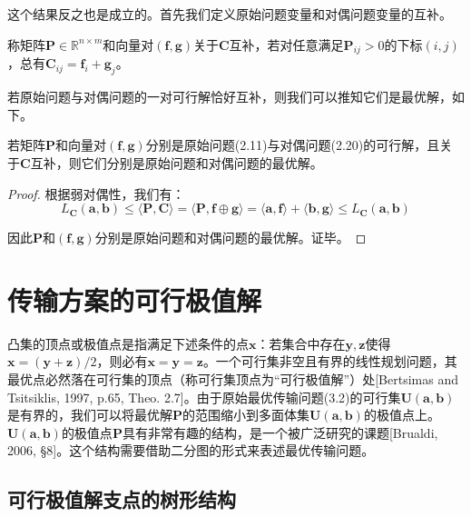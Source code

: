 \documentclass[cn,10pt,math=newtx,citestyle=gb7714-2015,bibstyle=gb7714-2015]{elegantbook}
\begin{document}
这个结果反之也是成立的。首先我们定义原始问题变量和对偶问题变量的互补。

\begin{definition}[互补]
称矩阵$\mathbf{P}\in\mathbb{R}^{n\times m}$和向量对$(\mathbf{f,g})$关于$\mathbf{C}$互补，若对任意满足$\mathbf{P}_{ij}>0$的下标$(i,j)$，总有$\mathbf{C}_{ij}=\mathbf{f}_i+\mathbf{g}_j$。
\end{definition}

若原始问题与对偶问题的一对可行解恰好互补，则我们可以推知它们是最优解，如下。

\begin{proposition}
若矩阵$\mathbf{P}$和向量对$(\mathbf{f,g})$分别是原始问题(2.11)与对偶问题(2.20)的可行解，且关于$\mathbf{C}$互补，则它们分别是原始问题和对偶问题的最优解。
\end{proposition}

\begin{proof}
根据弱对偶性，我们有：
\begin{equation*}
    L_\mathbf{C}(\mathbf{a,b})\leq \langle \mathbf{P},\mathbf{C} \rangle = \langle \mathbf{P}, \mathbf{f}\oplus \mathbf{g} \rangle = \langle \mathbf{a,f} \rangle + \langle \mathbf{b,g} \rangle \leq L_\mathbf{C}(\mathbf{a,b})
\end{equation*}

因此$\mathbf{P}$和$(\mathbf{f,g})$分别是原始问题和对偶问题的最优解。证毕。
\end{proof}

\section{传输方案的可行极值解}

凸集的顶点或极值点是指满足下述条件的点$\mathbf{x}$：若集合中存在$\mathbf{y,z}$使得$\mathbf{x}=(\mathbf{y}+\mathbf{z})/2$，则必有$\mathbf{x=y=z}$。一个可行集非空且有界的线性规划问题，其最优点必然落在可行集的顶点（称可行集顶点为“可行极值解”）处[Bertsimas and Tsitsiklis, 1997, p.65, Theo. 2.7]。由于原始最优传输问题(3.2)的可行集$\mathbf{U(a,b)}$是有界的，我们可以将最优解$\mathbf{P}$的范围缩小到多面体集$\mathbf{U(a,b)}$的极值点上。$\mathbf{U(a,b)}$的极值点$\mathbf{P}$具有非常有趣的结构，是一个被广泛研究的课题[Brualdi, 2006, \S 8]。这个结构需要借助二分图的形式来表述最优传输问题。

\subsection{可行极值解支点的树形结构}
\end{document}
